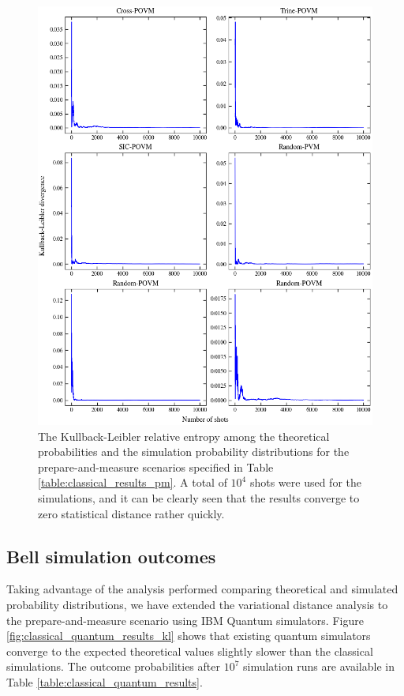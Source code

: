 \begin{figure}[h!]
\centering
\includegraphics[width=\textwidth]{images/pm_povm_kl.png}
\caption{The Kullback-Leibler relative entropy among the theoretical probabilities and the simulation probability distributions for the prepare-and-measure scenarios specified in Table \ref{table:classical_results_pm}. A total of $10^4$ shots were used for the simulations, and it can be clearly seen that the results converge to zero statistical distance rather quickly.}
\label{fig:classical_results_kl}
\end{figure}

\subsection{Bell simulation outcomes}
Taking advantage of the analysis performed comparing theoretical and simulated probability distributions, we have extended the variational distance analysis to the prepare-and-measure scenario using IBM Quantum simulators. Figure \ref{fig:classical_quantum_results_kl} shows that existing quantum simulators converge to the expected theoretical values slightly slower than the classical simulations. The outcome probabilities after $10^7$ simulation runs are available in Table \ref{table:classical_quantum_results}.

